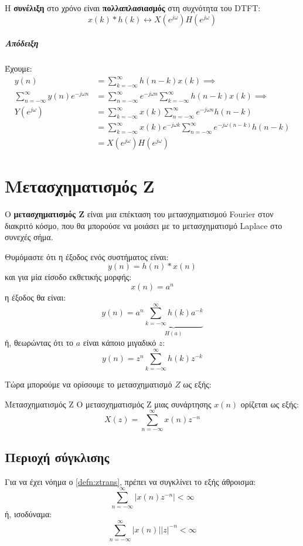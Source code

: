 \documentclass[11pt,a4paper,notitlepage,fleqn]{article}
\begin{document}
\begin{theorem}{}{}
	Η \textbf{συνέλιξη} στο χρόνο είναι \textbf{πολλαπλασιασμός} στη συχνότητα του DTFT:
	\[
	x(k) * h(k) \leftrightarrow X\left(e^{j\omega }\right) H\left(e^{j\omega }\right)
	\]
\end{theorem}

\subparagraph{Απόδειξη}
Έχουμε:
\begin{align*}
	y(n) &= \sum_{k=-\infty}^{\infty}
	h(n-k)x(k)
	\implies \\
	\sum_{n=-\infty}^{\infty}y(n)e^{-j\omega n} &= \sum_{n=-\infty}^{\infty}
	e^{-j\omega n}\sum_{k=-\infty}^{\infty} h(n-k)x(k)
	\implies \\
	Y\left(e^{j\omega }\right) &= \sum_{k=-\infty}^{\infty} x(k) \sum_{n=-\infty}^{\infty}e^{-j\omega n}h(n-k)
    \\ &=
    \sum_{k=-\infty}^{\infty}x(k)e^{-j\omega k}\sum_{n=-\infty}^{\infty}e^{-j\omega (n-k)}h(n-k)
    \\ &= X\left(e^{j\omega }\right) H\left(e^{j\omega }\right)
\end{align*}

\section{Μετασχηματισμός Z}
Ο \textbf{μετασχηματισμός Z} είναι μια επέκταση του μετασχηματισμού Fourier στον διακριτό κόσμο, που
θα μπορούσε να μοιάσει με το μετασχηματισμό Laplace στο συνεχές σήμα.

Θυμόμαστε ότι η έξοδος ενός συστήματος είναι:
\[
y(n) = h(n) * x(n)
\]
και για μία είσοδο εκθετικής μορφής:
\[
x(n) =a^n
\]
η έξοδος θα είναι:
\[
y(n) = a^n \underbrace{\sum_{k=-\infty}^{\infty} h(k)a^{-k}}_{H(a)}
\]
ή, θεωρώντας ότι το \( a \) είναι κάποιο μιγαδικό \( z \):
\[
y(n) = z^n \sum_{k=-\infty}^{\infty} h(k)z^{-k}
\]

Τώρα μπορούμε να ορίσουμε το μετασχηματισμό \( Z \) ως εξής:
\begin{defn}[label=defn:ztrans]{Μετασχηματισμός Z}{}
	Ο μετασχηματισμός Z μιας συνάρτησης \( x(n) \) ορίζεται ως εξής:
	\[
	X(z) = \sum_{n=-\infty}^{\infty} x(n) z^{-n}
	\]
\end{defn}

\subsection{Περιοχή σύγκλισης}

Για να έχει νόημα ο \autoref{defn:ztrans}, πρέπει να συγκλίνει το εξής άθροισμα:
\[
\sum_{n=-\infty}^{\infty} \left| x(n)z^{-n} \right| < \infty
\]
ή, ισοδύναμα:
\[
\sum_{n=-\infty}^{\infty} \left\lvert x(n) \right\rvert \left\lvert z\right\rvert^{-n} < \infty
\]
\end{document}

